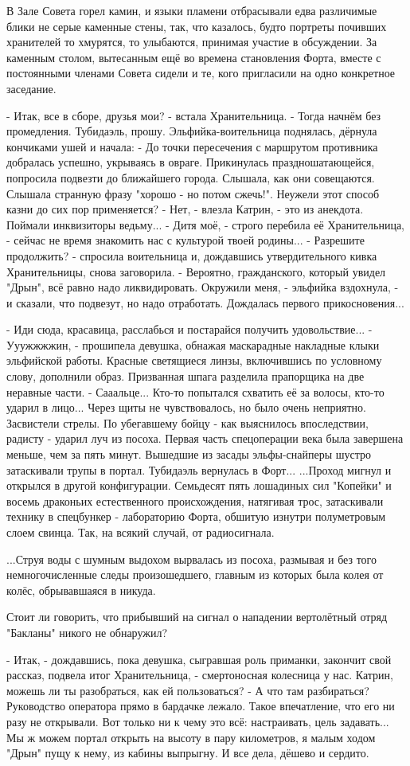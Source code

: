 В Зале Совета горел камин, и языки пламени отбрасывали едва различимые блики не серые каменные стены, так, что казалось, будто портреты почивших хранителей то хмурятся, то улыбаются, принимая участие в обсуждении. За каменным столом, вытесанным ещё во времена становления Форта, вместе с постоянными членами Совета сидели и те, кого пригласили на одно конкретное заседание.

 - Итак, все в сборе, друзья мои? - встала Хранительница. - Тогда начнём без промедления. Тубидаэль, прошу.
Эльфийка-воительница поднялась, дёрнула кончиками ушей и начала:
 - До точки пересечения с маршрутом противника добралась успешно, укрываясь в овраге. Прикинулась праздношатающейся, попросила подвезти до ближайшего города. Слышала, как они совещаются. Слышала странную фразу "хорошо - но потом сжечь!". Неужели этот способ казни до сих пор применяется?
 - Нет, - влезла Катрин, - это из анекдота. Поймали инквизиторы ведьму...
 - Дитя моё, - строго перебила её Хранительница, - сейчас не время знакомить нас с культурой твоей родины...
 - Разрешите продолжить? - спросила воительница и, дождавшись утвердительного кивка Хранительницы, снова заговорила. - Вероятно, гражданского, который увидел "Дрын", всё равно надо ликвидировать. Окружили меня, - эльфийка вздохнула, - и сказали, что подвезут, но надо отработать. Дождалась первого прикосновения...

 - Иди сюда, красавица, расслабься и постарайся получить удовольствие...
 - Ууужжжжин, - прошипела девушка, обнажая маскарадные накладные клыки эльфийской работы. Красные светящиеся линзы, включившись по условному слову, дополнили образ.
Призванная шпага разделила прапорщика на две неравные части.
 - Сааальце...
Кто-то попытался схватить её за волосы, кто-то ударил в лицо... Через щиты не чувствовалось, но было очень неприятно. Засвистели стрелы. По убегавшему бойцу - как выяснилось впоследствии, радисту - ударил луч из посоха. Первая часть спецоперации века была завершена меньше, чем за пять минут.
Вышедшие из засады эльфы-снайперы шустро затаскивали трупы в портал. Тубидаэль вернулась в Форт...
...Проход мигнул и открылся в другой конфигурации. Семьдесят пять лошадиных сил "Копейки" и восемь драконьих естественного происхождения, натягивая трос, затаскивали технику в спецбункер - лабораторию Форта, обшитую изнутри полуметровым слоем свинца. Так, на всякий случай, от радиосигнала.

...Струя воды с шумным выдохом вырвалась из посоха, размывая и без того немногочисленные следы произошедшего, главным из которых была колея от колёс, обрывавшаяся в никуда.

Стоит ли говорить, что прибывший на сигнал о нападении вертолётный отряд "Бакланы" никого не обнаружил?


 - Итак, - дождавшись, пока девушка, сыгравшая роль приманки, закончит свой рассказ, подвела итог Хранительница, - смертоносная колесница у нас. Катрин, можешь ли ты разобраться, как ей пользоваться?
 - А что там разбираться? Руководство оператора прямо в бардачке лежало. Такое впечатление, что его ни разу не открывали. Вот только ни к чему это всё: настраивать, цель задавать... Мы ж можем портал открыть на высоту в пару километров, я малым ходом "Дрын" пущу к нему, из кабины выпрыгну. И все дела, дёшево и сердито.
